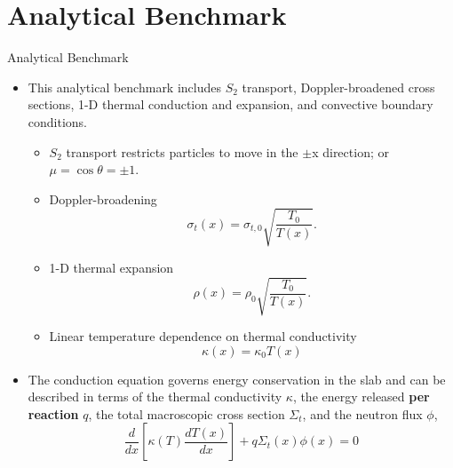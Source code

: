 \documentclass[9pt,t]{beamer}
\begin{document}
\section{Analytical Benchmark}
\begin{frame}{Analytical Benchmark}
    \pause
    \begin{itemize}
        \item<2-> This analytical benchmark includes $S_2$ transport, Doppler-broadened cross sections, 1-D thermal conduction
        and expansion, and convective boundary conditions.
        \begin{itemize}
            \item<3-> $S_{2}$ transport restricts particles to move in the $\pm$x direction; or $\mu=\cos\theta=\pm 1$.
            \item<4-> Doppler-broadening
            \begin{equation}\label{doppler-micro-xs}
                \sigma_{t}(x) = \sigma_{t,0}\sqrt{\frac{T_{0}}{T(x)}}.
            \end{equation}
            \item<5-> 1-D thermal expansion
            \begin{equation} \label{density-temp-relation}
                \rho(x) =  \rho_{0} \sqrt{\frac{T_{0}}{T(x)}}.
            \end{equation}
            \item<6-> Linear temperature dependence on thermal conductivity
            \begin{equation}\label{thermal-conductivity-temp-relation}
                \kappa(x) = \kappa_{0} T(x)
            \end{equation}
        \end{itemize}\vspace*{-0.4cm}
        \item<7-> The conduction equation governs energy conservation in the slab and can be described in terms of the thermal conductivity
        $\kappa$, the energy released \textbf{per reaction} $q$, the total macroscopic cross section $\Sigma_{t}$, and the neutron flux $\phi$,
        \begin{equation}
            \frac{d}{dx}\left\lbrack\kappa(T)\frac{dT(x)}{dx}\right\rbrack + q \Sigma_{t}(x)\phi(x) = 0
        \end{equation}
    \end{itemize}
\end{frame}
\end{document}
